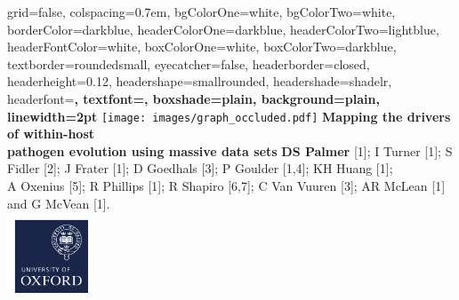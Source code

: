 \documentclass[portrait,final,a0paper,fontscale=0.277]{baposter}
\begin{document}


\begin{poster}%
  {
  grid=false,
  colspacing=0.7em,
  bgColorOne=white,
  bgColorTwo=white,
  borderColor=darkblue,
  headerColorOne=darkblue,
  headerColorTwo=lightblue,
  headerFontColor=white,
  boxColorOne=white,
  boxColorTwo=darkblue,
  textborder=roundedsmall,
  eyecatcher=false,
  headerborder=closed,
  headerheight=0.12\textheight,
  headershape=smallrounded,
  headershade=shadelr,
  headerfont=\Large\bf\textsc, %
  textfont={\setlength{\parindent}{1.5em}},
  boxshade=plain,
  background=plain,
  linewidth=2pt
  }
  {\texttt{[image: images/graph\_occluded.pdf]}} 
  {\vspace{0.3em}\bf Mapping the drivers of within-host \\ pathogen evolution using massive data
sets\vspace{0.2em}}
  {\small{{\bf DS Palmer} [1]; I Turner [1]; S Fidler [2]; J Frater [1]; D Goedhals [3]; P Goulder [1,4]; KH Huang [1];\\
  A Oxenius [5]; R Phillips [1]; R Shapiro [6,7]; C Van Vuuren [3]; AR McLean [1] and G McVean [1].}\\
  }
  {%
    \includegraphics[width=0.18\textwidth]{images/oxford.pdf}\\
}
\end{poster}
\end{document}
